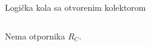 \begin{frame}[label=10-s035]{Logička kola sa otvorenim kolektorom}
\setlength{\abovedisplayskip}{4pt}\setlength{\belowdisplayskip}{4pt}\setlength{\abovedisplayshortskip}{3pt}\setlength{\belowdisplayshortskip}{3pt}
\begin{columns}[T,onlytextwidth]\par Nema otpornika $R_C$.\centering \end{columns}\smallskip\centering
\end{frame}
